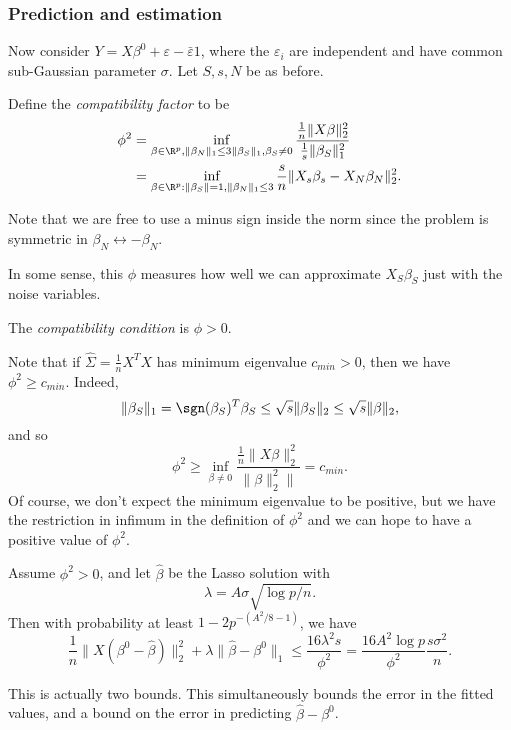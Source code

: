 \documentclass[a4paper]{article}
\begin{document}
\subsubsection*{Prediction and estimation}
Now consider $Y = X \beta^0 + \varepsilon - \bar{\varepsilon} 1$, where the $\varepsilon_i$ are independent and have common sub-Gaussian parameter $\sigma$. Let $S, s, N$ be as before.

\begin{defi}
  Define the \emph{compatibility factor} to be
  \begin{align*}
    \phi^2 &= \inf_{\beta \in \R^p, \|\beta_N\|_1 \leq 3 \|\beta_S\|_1, \beta_S \not= 0} \frac{\frac{1}{n} \|X \beta\|_2^2}{ \frac{1}{s} \|\beta_S\|^2_1}\\
    &= \inf_{\beta \in \R^p: \|\beta_S\| = 1, \|\beta_N\|_1 \leq 3} \frac{s}{n} \|X_s \beta_s - X_N \beta_N\|_2^2.
  \end{align*}
\end{defi}
Note that we are free to use a minus sign inside the norm since the problem is symmetric in $\beta_N \leftrightarrow -\beta_N$.

In some sense, this $\phi$ measures how well we can approximate $X_S \beta_S$ just with the noise variables.
\begin{defi}
  The \emph{compatibility condition} is $\phi > 0$.
\end{defi}

Note that if $\hat{\Sigma} = \frac{1}{n} X^T X$ has minimum eigenvalue $c_{min} > 0$, then we have $\phi^2 \geq c_{min}$. Indeed,
\[
  \|\beta_S\|_1 = \sgn (\beta_S)^T \beta_S \leq \sqrt{s} \|\beta_S\|_2 \leq \sqrt{s} \|\beta\|_2,
\]
and so
\[
  \phi^2 \geq \inf_{\beta \not= 0} \frac{\frac{1}{n} \|X \beta\|_2^2}{\|\beta\|_2^2\|} = c_{min}.
\]
Of course, we don't expect the minimum eigenvalue to be positive, but we have the restriction in infimum in the definition of $\phi^2$ and we can hope to have a positive value of $\phi^2$.

\begin{thm}
  Assume $\phi^2 > 0$, and let $\hat{\beta}$ be the Lasso solution with
  \[
    \lambda = A \sigma \sqrt{\log p/n}.
  \]
  Then with probability at least $1 - 2p^{-(A^2/8 - 1)}$, we have
  \[
    \frac{1}{n} \|X (\beta^0 - \hat{\beta})\|_2^2 + \lambda\|\hat{\beta} - \beta^0\|_1 \leq \frac{16 \lambda^2 s}{\phi^2} = \frac{16 A^2 \log p}{\phi^2} \frac{s \sigma^2}{n}.
  \]
\end{thm}
This is actually two bounds. This simultaneously bounds the error in the fitted values, and a bound on the error in predicting $\hat{\beta} - \beta^0$.
\end{document}
